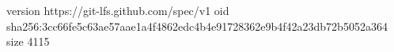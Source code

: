 version https://git-lfs.github.com/spec/v1
oid sha256:3cc66fe5c63ae57aae1a4f4862edc4b4e91728362e9b4f42a23db72b5052a364
size 4115

